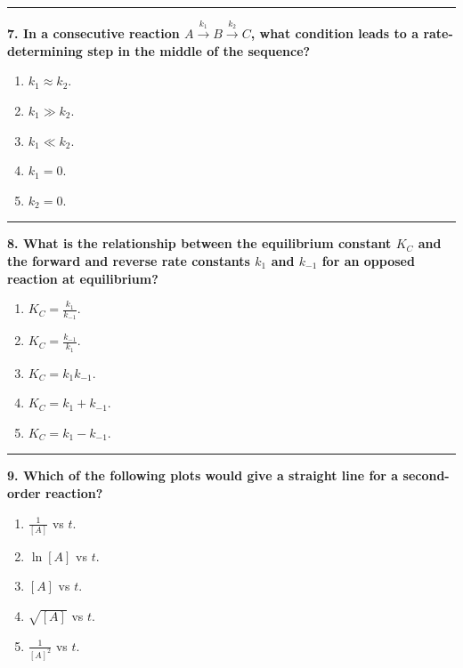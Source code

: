 \documentclass[
  9pt,
]{extbook}
\providecommand{\tightlist}{%
  \setlength{\itemsep}{0pt}\setlength{\parskip}{0pt}}
\theoremstyle{definition}
\theoremstyle{definition}
\theoremstyle{definition}
\theoremstyle{remark}
\begin{document}
\begin{center}\rule{0.5\linewidth}{0.5pt}\end{center}

\textbf{7. In a consecutive reaction \(A \xrightarrow{k_1} B \xrightarrow{k_2} C\), what condition leads to a rate-determining step in the middle of the sequence?}

\begin{enumerate}
\def\labelenumi{\alph{enumi}.}
\tightlist
\item
  \(k_1 \approx k_2\).
\item
  \(k_1 \gg k_2\).
\item
  \(k_1 \ll k_2\).
\item
  \(k_1 = 0\).
\item
  \(k_2 = 0\).
\end{enumerate}

\begin{center}\rule{0.5\linewidth}{0.5pt}\end{center}

\textbf{8. What is the relationship between the equilibrium constant \(K_C\) and the forward and reverse rate constants \(k_1\) and \(k_{-1}\) for an opposed reaction at equilibrium?}

\begin{enumerate}
\def\labelenumi{\alph{enumi}.}
\tightlist
\item
  \(K_C = \frac{k_1}{k_{-1}}\).
\item
  \(K_C = \frac{k_{-1}}{k_1}\).
\item
  \(K_C = k_1 k_{-1}\).
\item
  \(K_C = k_1 + k_{-1}\).
\item
  \(K_C = k_1 - k_{-1}\).
\end{enumerate}

\begin{center}\rule{0.5\linewidth}{0.5pt}\end{center}

\textbf{9. Which of the following plots would give a straight line for a second-order reaction?}

\begin{enumerate}
\def\labelenumi{\alph{enumi}.}
\tightlist
\item
  \(\frac{1}{[A]}\) vs \(t\).
\item
  \(\ln[A]\) vs \(t\).
\item
  \([A]\) vs \(t\).
\item
  \(\sqrt{[A]}\) vs \(t\).
\item
  \(\frac{1}{[A]^2}\) vs \(t\).
\end{enumerate}
\end{document}
